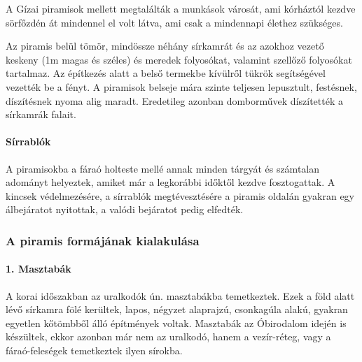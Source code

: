 A Gízai piramisok mellett megtalálták a munkások városát, ami kórháztól kezdve sörfőzdén át mindennel el volt látva, ami csak a mindennapi élethez szükséges. 

Az piramis belül tömör, mindössze néhány sírkamrát és az azokhoz vezető keskeny (1m magas és széles) és meredek folyosókat, valamint szellőző folyosókat tartalmaz. Az építkezés alatt a belső termekbe kívülről tükrök segítségével vezették be a fényt. A piramisok belseje mára szinte teljesen lepusztult, festésnek, díszítésnek nyoma alig maradt. Eredetileg azonban domborművek díszítették a sírkamrák falait.

\paragraph{Sírrablók} A piramisokba a fáraó holteste mellé annak minden tárgyát és számtalan adományt helyeztek, amiket már a legkorábbi időktől kezdve fosztogattak. A kincsek védelmezésére, a sírrablók megtévesztésére a piramis oldalán gyakran egy álbejáratot nyitottak, a valódi bejáratot pedig elfedték.

\subsubsection*{A piramis formájának kialakulása}

\begin{figure}
\end{figure}

\paragraph{1. Masztabák} 
A korai időszakban az uralkodók ún. masztabákba temetkeztek. Ezek a föld alatt lévő sírkamra fölé kerültek, lapos, négyzet alaprajzú, csonkagúla alakú, gyakran egyetlen kőtömbből álló építmények voltak. Masztabák az Óbirodalom idején is készültek, ekkor azonban már nem az uralkodó, hanem a vezír-réteg, vagy a fáraó-feleségek temetkeztek ilyen sírokba.

\begin{figure}
\end{figure}

